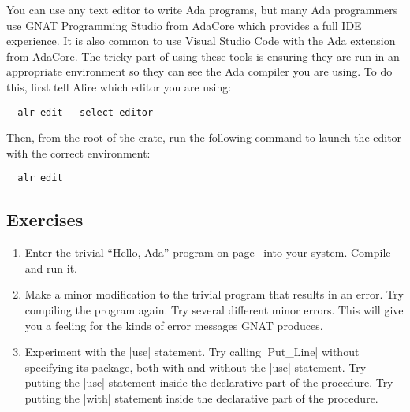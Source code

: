You can use any text editor to write Ada programs, but many Ada programmers use GNAT Programming
Studio from AdaCore which provides a full IDE experience. It is also common to use Visual Studio
Code with the Ada extension from AdaCore. The tricky part of using these tools is ensuring they
are run in an appropriate environment so they can see the Ada compiler you are using. To do
this, first tell Alire which editor you are using:

\begin{Verbatim}
  alr edit --select-editor
\end{Verbatim}

\noindent Then, from the root of the crate, run the following command to launch the editor with the
correct environment:

\begin{Verbatim}
  alr edit
\end{Verbatim}

\subsection*{Exercises}

\begin{enumerate}
\item Enter the trivial ``Hello, Ada'' program on page~\pageref{lst:hello-ada} into your system.
  Compile and run it.

\item Make a minor modification to the trivial program that results in an error. Try compiling
  the program again. Try several different minor errors. This will give you a feeling for the
  kinds of error messages GNAT produces.

\item Experiment with the |use| statement. Try calling |Put_Line| without specifying its
  package, both with and without the |use| statement. Try putting the |use| statement inside the
  declarative part of the procedure. Try putting the |with| statement inside the declarative
  part of the procedure.
\end{enumerate}

